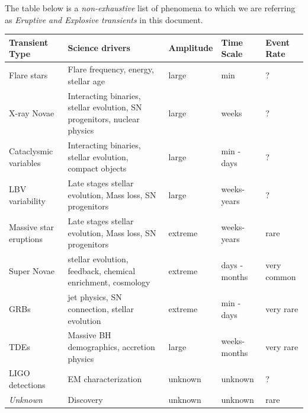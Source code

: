 The table below is a \emph{non-exhaustive} list of
phenomena to which we are referring as \emph{Eruptive and Explosive
  transients} in this document.

\begin{center}
  \begin{tabular}{| p{4.5cm} | p{6.0cm} | l | l | p{0.5cm}|}
    \hline

    Transient Type & Science drivers & Amplitude & Time Scale & Event Rate\\
\hline

Flare stars & Flare frequency, energy, stellar age & large & min & ?\\

X-ray Novae & Interacting binaries, stellar evolution, SN progenitors, nuclear physics & large & weeks & ?\\

Cataclysmic variables & Interacting binaries, stellar evolution, compact objects & large & min - days & ?\\

LBV variability & Late stages stellar evolution, Mass loss, SN progenitors & large & weeks-years & ?\\

Massive star eruptions & Late stages stellar evolution, Mass loss, SN progenitors & extreme & weeks-years & rare\\

Super Novae & stellar evolution, feedback, chemical enrichment, cosmology & extreme & days - months & very common\\


GRBs & jet physics, SN connection, stellar evolution & extreme & min - days
& very rare\\

TDEs & Massive BH demographics, accretion physics & large & weeks-months & very rare\\


LIGO detections & EM characterization & unknown & unknown & ?\\

\emph{Unknown} & Discovery & unknown & unknown & rare\\

 \hline \end{tabular}
\end{center}

